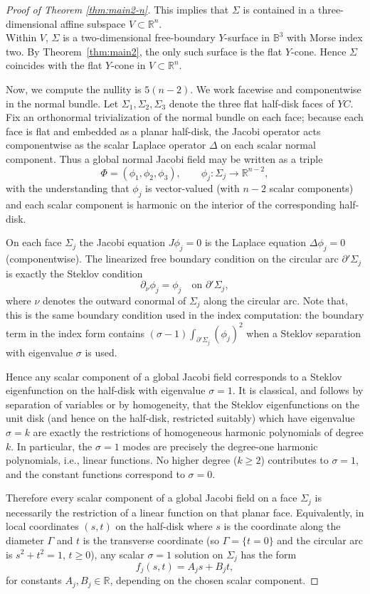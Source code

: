 \documentclass[11pt]{amsart}
\numberwithin{equation}{section}
\theoremstyle{theorem}
\theoremstyle{definition}
\numberwithin{equation}{section}
\begin{document}
\begin{proof}[Proof of Theorem \ref{thm:main2-n}]
This implies that $\Sigma$ is contained in a three-dimensional affine subspace $V \subset \mathbb{R}^n$.\\
Within $V$, $\Sigma$ is a two-dimensional free-boundary $Y$-surface in $\mathbb{B}^3$ with Morse index two. By Theorem~\ref{thm:main2}, the only such surface is the flat $Y$-cone. Hence $\Sigma$ coincides with the flat $Y$-cone in $V \subset \mathbb{R}^n$.
\medskip


Now, we compute the nullity is $5(n-2)$. We work facewise and componentwise in the normal bundle.  Let $\Sigma_1,\Sigma_2,\Sigma_3$ denote the three flat half-disk faces of $YC$.  Fix an orthonormal trivialization of the normal bundle on each face; because each face is flat and embedded as a planar half-disk, the Jacobi operator acts componentwise as the scalar Laplace operator $\Delta$ on each scalar normal component.  Thus a global normal Jacobi field may be written as a triple
\[
\Phi=(\phi_1,\phi_2,\phi_3),\qquad \phi_j:\Sigma_j\to\mathbb{R}^{n-2},
\]
with the understanding that $\phi_j$ is vector-valued (with $n-2$ scalar components) and each scalar component is harmonic on the interior of the corresponding half-disk.
\medskip

On each face $\Sigma_j$ the Jacobi equation $J\phi_j=0$ is the Laplace equation $\Delta \phi_j=0$ (componentwise). The linearized free boundary condition on the circular arc $\partial'\Sigma_j$ is exactly the Steklov condition
\[
\partial_\nu \phi_j = \phi_j \quad\text{on }\partial'\Sigma_j,
\]
where $\nu$ denotes the outward conormal of $\Sigma_j$ along the circular arc. Note that, this is the same boundary condition used in the index computation: the boundary term in the index form contains $(\sigma-1)\int_{\partial'\Sigma_j}(\phi_j)^2$ when a Steklov separation with eigenvalue $\sigma$ is used.  

Hence any scalar component of a global Jacobi field corresponds to a Steklov eigenfunction on the half-disk with eigenvalue $\sigma=1$.  It is classical, and follows by separation of variables or by homogeneity, that the Steklov eigenfunctions on the unit disk (and hence on the half-disk, restricted suitably) which have eigenvalue $\sigma=k$ are exactly the restrictions of homogeneous harmonic polynomials of degree $k$.  In particular, the $\sigma=1$ modes are precisely the degree-one harmonic polynomials, i.e., linear functions.  No higher degree ($k\ge2$) contributes to $\sigma=1$, and the constant functions correspond to $\sigma=0$.

Therefore every scalar component of a global Jacobi field on a face $\Sigma_j$ is necessarily the restriction of a linear function on that planar face.  Equivalently, in local coordinates $(s,t)$ on the half-disk where $s$ is the coordinate along the diameter $\Gamma$ and $t$ is the transverse coordinate (so $\Gamma=\{t=0\}$ and the circular arc is $s^2+t^2=1$, $t\ge0$), any scalar $\sigma=1$ solution on $\Sigma_j$ has the form
\[
f_j(s,t) = A_j s + B_j t,
\]
for constants $A_j,B_j\in\mathbb{R}$, depending on the chosen scalar component.
\medskip


\end{proof}
\end{document}
